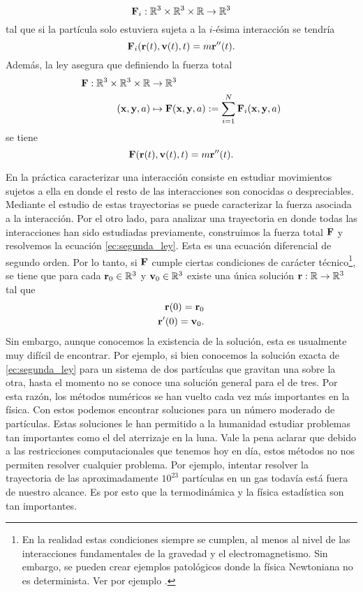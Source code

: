\documentclass{article}
\begin{document}
\begin{equation}
\vb{F}_i:\mathbb{R}^3\times\mathbb{R}^3\times\mathbb{R}\rightarrow\mathbb{R}^3
\end{equation}
tal que si la partícula solo estuviera sujeta a la $i$-ésima interacción se tendría
\begin{equation}
\vb{F}_i(\vb{r}(t),\vb{v}(t),t)=m\vb{r}''(t).
\end{equation}
Además, la ley asegura que definiendo la fuerza total
\begin{align}
\begin{split}
\vb{F}:\mathbb{R}^3\times\mathbb{R}^3\times\mathbb{R}&\rightarrow\mathbb{R}^3\\
(\vb{x},\vb{y},a)&\mapsto\vb{F}(\vb{x},\vb{y},a):=\sum_{i=1}^N\vb{F}_i(\vb{x},\vb{y},a)
\end{split}
\end{align}
se tiene
\begin{equation}\label{ec:segunda_ley}
\vb{F}(\vb{r}(t),\vb{v}(t),t)=m\vb{r}''(t).
\end{equation}

En la práctica caracterizar una interacción consiste en estudiar movimientos sujetos a ella en donde el resto de las interacciones son conocidas o despreciables. Mediante el estudio de estas trayectorias se puede caracterizar la fuerza asociada a la interacción. Por el otro lado, para analizar una trayectoria en donde todas las interacciones han sido estudiadas previamente, construimos la fuerza total $\vb{F}$ y resolvemos la ecuación \eqref{ec:segunda_ley}. Esta es una ecuación diferencial de segundo orden. Por lo tanto, si $\vb{F}$ cumple ciertas condiciones de carácter técnico\footnote{En la realidad estas condiciones siempre se cumplen, al menos al nivel de las interacciones fundamentales de la gravedad y el electromagnetismo. Sin embargo, se pueden crear ejemplos patológicos donde la física Newtoniana no es determinista. Ver por ejemplo \cite{Norton2003}.}, se tiene que para cada $\vb{r}_0\in\mathbb{R}^3$ y $\vb{v}_0\in\mathbb{R}^3$ existe una única solución $\vb{r}:\mathbb{R}\rightarrow\mathbb{R}^3$ tal que
\begin{align}
\vb{r}(0)=\vb{r}_0\\
\vb{r}'(0)=\vb{v}_0.
\end{align}
Sin embargo, aunque conocemos la existencia de la solución, esta es usualmente muy difícil de encontrar. Por ejemplo, si bien conocemos la solución exacta de \eqref{ec:segunda_ley} para un sistema de dos partículas que gravitan una sobre la otra, hasta el momento no se conoce una solución general para el de tres. Por esta razón, los métodos numéricos se han vuelto cada vez más importantes en la física. Con estos podemos encontrar soluciones para un número moderado de partículas. Estas soluciones le han permitido a la humanidad estudiar problemas tan importantes como el del aterrizaje en la luna. Vale la pena aclarar que debido a las restricciones computacionales que tenemos hoy en día, estos métodos no nos permiten resolver cualquier problema. Por ejemplo, intentar resolver la trayectoria de las aproximadamente $10^{23}$ partículas en un gas todavía está fuera de nuestro alcance. Es por esto que la termodinámica y la física estadística son tan importantes.
\end{document}
